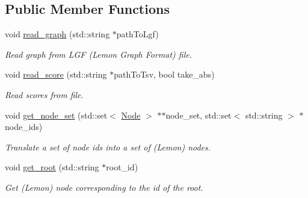 \subsection*{Public Member Functions}
\begin{DoxyCompactItemize}
\item 
void \hyperlink{classderegnet_1_1DeregnetData_ae5edd8f077b20056f416d42ef3fb03d2}{read\+\_\+graph} (std\+::string $\ast$path\+To\+Lgf)
\begin{DoxyCompactList}\small\item\em Read graph from L\+GF (Lemon Graph Format) file. \end{DoxyCompactList}\item 
void \hyperlink{classderegnet_1_1DeregnetData_a01308048556370738e4ac335aba62ffd}{read\+\_\+score} (std\+::string $\ast$path\+To\+Tsv, bool take\+\_\+abs)
\begin{DoxyCompactList}\small\item\em Read scores from file. \end{DoxyCompactList}\item 
void \hyperlink{classderegnet_1_1DeregnetData_a7d662c0dd84d814bbaaf56718a99306a}{get\+\_\+node\+\_\+set} (std\+::set$<$ \hyperlink{namespacederegnet_a744bad34f2de9856d36715a445f027f3}{Node} $>$ $\ast$$\ast$node\+\_\+set, std\+::set$<$ std\+::string $>$ $\ast$node\+\_\+ids)
\begin{DoxyCompactList}\small\item\em Translate a set of node id\textquotesingle{}s into a set of (Lemon) nodes. \end{DoxyCompactList}\item 
void \hyperlink{classderegnet_1_1DeregnetData_aaef262d5ca460f10851b25c01ad2f9bc}{get\+\_\+root} (std\+::string $\ast$root\+\_\+id)
\begin{DoxyCompactList}\small\item\em Get (Lemon) node corresponding to the id of the root. \end{DoxyCompactList}\end{DoxyCompactItemize}
